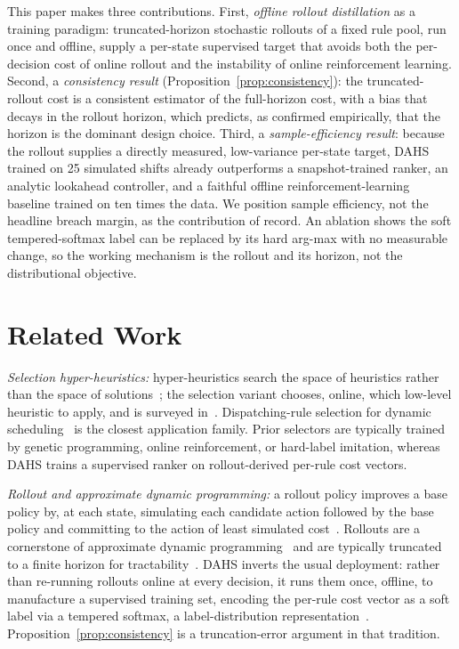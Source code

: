\documentclass[conference]{IEEEtran}
\begin{document}
This paper makes three contributions. First, \emph{offline rollout distillation}
as a training paradigm: truncated-horizon stochastic rollouts of a fixed rule
pool, run once and offline, supply a per-state supervised target that avoids both
the per-decision cost of online rollout and the instability of online
reinforcement learning. Second, a \emph{consistency result}
(Proposition~\ref{prop:consistency}): the truncated-rollout cost is a consistent
estimator of the full-horizon cost, with a bias that decays in the rollout
horizon, which predicts, as confirmed empirically, that the horizon is the dominant
design choice. Third, a \emph{sample-efficiency result}: because the rollout
supplies a directly measured, low-variance per-state target, DAHS trained on 25
simulated shifts already outperforms a snapshot-trained ranker, an analytic
lookahead controller, and a faithful offline reinforcement-learning baseline
trained on ten times the data. We position sample efficiency, not the headline
breach margin, as the contribution of record. An ablation shows the soft
tempered-softmax label can be replaced by its hard arg-max with no measurable
change, so the working mechanism is the rollout and its horizon, not the
distributional objective.

\section{Related Work}
\label{sec:related}

\textit{Selection hyper-heuristics:} hyper-heuristics search the space of
heuristics rather than the space of solutions~\cite{drake2020hyperheuristics}; the
selection variant chooses, online, which low-level heuristic to apply, and is
surveyed in~\cite{dokeroglu2024hyperheuristics}. Dispatching-rule selection for
dynamic scheduling~\cite{durasevic2022dispatching} is the closest application
family. Prior selectors are typically trained by genetic programming, online
reinforcement, or hard-label imitation, whereas DAHS trains a supervised ranker on
rollout-derived per-rule cost vectors.

\textit{Rollout and approximate dynamic programming:} a rollout policy improves a
base policy by, at each state, simulating each candidate action followed by the
base policy and committing to the action of least simulated
cost~\cite{bertsekas2020rollout}. Rollouts are a cornerstone of approximate dynamic
programming~\cite{simchilevi2021adp} and are typically truncated to a finite horizon
for tractability~\cite{he2024truncatedrollout}. DAHS inverts the usual deployment:
rather than re-running rollouts online at every decision, it runs them once,
offline, to manufacture a supervised training set, encoding the per-rule cost vector
as a soft label via a tempered softmax, a label-distribution
representation~\cite{geng2016ldl}. Proposition~\ref{prop:consistency} is a
truncation-error argument in that tradition.
\end{document}
